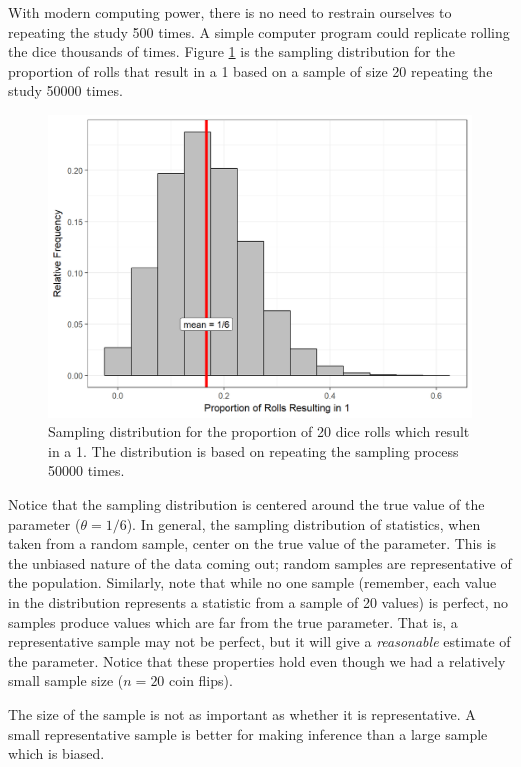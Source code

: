 \documentclass[]{book}
\theoremstyle{definition}
\theoremstyle{definition}
\theoremstyle{definition}
\theoremstyle{remark}
\let\BeginKnitrBlock\begin \let\EndKnitrBlock\end
\begin{document}
With modern computing power, there is no need to restrain ourselves to
repeating the study 500 times. A simple computer program could replicate
rolling the dice thousands of times. Figure
\ref{fig:samplingdistns-dice-histogram} is the sampling distribution for
the proportion of rolls that result in a 1 based on a sample of size 20
repeating the study 50000 times.

\begin{figure}

{\centering \includegraphics[width=0.8\linewidth]{./Images/samplingdistns-dice-histogram-1} 

}

\caption{Sampling distribution for the proportion of 20 dice rolls which result in a 1.  The distribution is based on repeating the sampling process 50000 times.}\label{fig:samplingdistns-dice-histogram}
\end{figure}

Notice that the sampling distribution is centered around the true value
of the parameter (\(\theta = 1/6\)). In general, the sampling
distribution of statistics, when taken from a random sample, center on
the true value of the parameter. This is the unbiased nature of the data
coming out; random samples are representative of the population.
Similarly, note that while no one sample (remember, each value in the
distribution represents a statistic from a sample of 20 values) is
perfect, no samples produce values which are far from the true
parameter. That is, a representative sample may not be perfect, but it
will give a \emph{reasonable} estimate of the parameter. Notice that
these properties hold even though we had a relatively small sample size
(\(n = 20\) coin flips).

\BeginKnitrBlock{rmdkeyidea}
The size of the sample is not as important as whether it is
representative. A small representative sample is better for making
inference than a large sample which is biased.
\EndKnitrBlock{rmdkeyidea}
\end{document}
